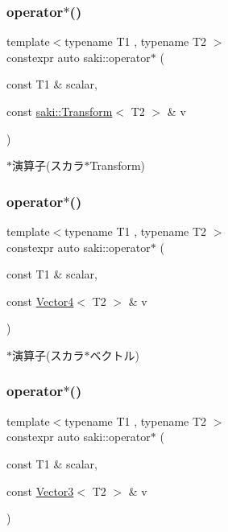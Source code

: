 \subsubsection{\texorpdfstring{operator$\ast$()}{operator*()}\hspace{0.1cm}{\footnotesize\ttfamily [5/14]}}
{\footnotesize\ttfamily template$<$typename T1 , typename T2 $>$ \\
constexpr auto saki\+::operator$\ast$ (\begin{DoxyParamCaption}\item[{const T1 \&}]{scalar,  }\item[{const \mbox{\hyperlink{classsaki_1_1_transform}{saki\+::\+Transform}}$<$ T2 $>$ \&}]{v }\end{DoxyParamCaption})}



$\ast$演算子(スカラ$\ast$\+Transform) 

\mbox{\label{namespacesaki_adb31a759973c1c3d861bcaa5375f58bd}} 
\subsubsection{\texorpdfstring{operator$\ast$()}{operator*()}\hspace{0.1cm}{\footnotesize\ttfamily [6/14]}}
{\footnotesize\ttfamily template$<$typename T1 , typename T2 $>$ \\
constexpr auto saki\+::operator$\ast$ (\begin{DoxyParamCaption}\item[{const T1 \&}]{scalar,  }\item[{const \mbox{\hyperlink{classsaki_1_1_vector4}{Vector4}}$<$ T2 $>$ \&}]{v }\end{DoxyParamCaption})}



$\ast$演算子(スカラ$\ast$ベクトル) 

\mbox{\label{namespacesaki_a74073980f30054780d16bbda306bb0c4}} 
\subsubsection{\texorpdfstring{operator$\ast$()}{operator*()}\hspace{0.1cm}{\footnotesize\ttfamily [7/14]}}
{\footnotesize\ttfamily template$<$typename T1 , typename T2 $>$ \\
constexpr auto saki\+::operator$\ast$ (\begin{DoxyParamCaption}\item[{const T1 \&}]{scalar,  }\item[{const \mbox{\hyperlink{classsaki_1_1_vector3}{Vector3}}$<$ T2 $>$ \&}]{v }\end{DoxyParamCaption})}



